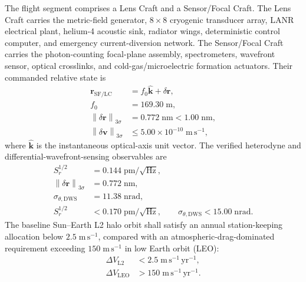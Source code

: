 \documentclass[10pt,twocolumn]{IEEEtran}
\begin{document}
The flight segment comprises a Lens Craft and a Sensor/Focal Craft. The Lens Craft carries the metric-field generator, $8\times8$ cryogenic transducer array, LANR electrical plant, helium-4 acoustic sink, radiator wings, deterministic control computer, and emergency current-diversion network. The Sensor/Focal Craft carries the photon-counting focal-plane assembly, spectrometers, wavefront sensor, optical crosslinks, and cold-gas/microelectric formation actuators. Their commanded relative state is
\begin{equation}
\begin{aligned}
\bm r_{\mathrm{SF/LC}} &= f_0\widehat{\bm k}+\delta\bm r, \\
f_0 &= 169.30\;\mathrm{m}, \\
\left\|\delta\bm r\right\|_{3\sigma} &=0.772\;\mathrm{nm}
<1.00\;\mathrm{nm}, \\
\left\|\delta\bm v\right\|_{3\sigma} &\leq 5.00\times10^{-10}\;\mathrm{m\,s^{-1}},
\end{aligned}
\label{eq:formation_state}
\end{equation}
where $\widehat{\bm k}$ is the instantaneous optical-axis unit vector. The verified heterodyne and differential-wavefront-sensing observables are
\begin{equation}
\begin{aligned}
S_r^{1/2} &=0.144\;\mathrm{pm}/\sqrt{\mathrm{Hz}}, \\
\left\|\delta\bm r\right\|_{3\sigma} &=0.772\;\mathrm{nm}, \\
\sigma_{\theta,\mathrm{DWS}} &=11.38\;\mathrm{nrad}, \\
S_r^{1/2} &<0.170\;\mathrm{pm}/\sqrt{\mathrm{Hz}},\qquad
\sigma_{\theta,\mathrm{DWS}}<15.00\;\mathrm{nrad}.
\end{aligned}
\label{eq:verified_metrology}
\end{equation}
The baseline Sun--Earth L2 halo orbit shall satisfy an annual station-keeping allocation below $2.5\;\mathrm{m\,s^{-1}}$, compared with an atmospheric-drag-dominated requirement exceeding $150\;\mathrm{m\,s^{-1}}$ in low Earth orbit (LEO):
\begin{equation}
\begin{aligned}
\Delta V_{\mathrm{L2}} &< 2.5\;\mathrm{m\,s^{-1}\,yr^{-1}}, \\
\Delta V_{\mathrm{LEO}} &> 150\;\mathrm{m\,s^{-1}\,yr^{-1}}.
\end{aligned}
\label{eq:stationkeeping}
\end{equation}
\end{document}
